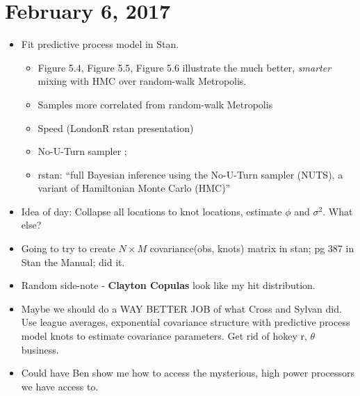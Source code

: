 \documentclass{article}
\begin{document}
\section*{February 6, 2017}

\begin{itemize}
\item Fit predictive process model in Stan. 
        \begin{itemize}
        \item \citep{Neal2011} Figure 5.4, Figure 5.5, Figure 5.6 illustrate the much better, {\it smarter} mixing with HMC over random-walk Metropolis.
        \item Samples more correlated from random-walk Metropolis \citep{Neal2011}
        \item Speed (LondonR rstan presentation)
        \item No-U-Turn sampler \citep{Hoffman2014}; 
        \item rstan: ``full Bayesian inference using the No-U-Turn sampler (NUTS), a variant of Hamiltonian Monte
Carlo (HMC)'' \citep{rSTANtheMan}
        \end{itemize}
\item Idea of day: Collapse all locations to knot locations, estimate $\phi$ and $\sigma^{2}$. What else?
\item Going to try to create $N \times M$ covariance(obs, knots) matrix in stan; pg 387 in Stan the Manual; did it. 
\item Random side-note - {\bf Clayton Copulas} look like my hit distribution.
\item Maybe we should do a WAY BETTER JOB of what Cross and Sylvan did. Use league averages, exponential covariance structure with predictive process model knots to estimate covariance parameters. Get rid of hokey r, $\theta$ business.
\item Could have Ben show me how to access the mysterious, high power processors we have access to.
\end{itemize}
\end{document}
